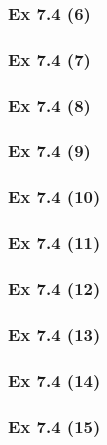 \subsubsection{Ex 7.4 (6)}\label{sec:Ex_7.4.6}

\subsubsection{Ex 7.4 (7)}\label{sec:Ex_7.4.7}

\subsubsection{Ex 7.4 (8)}\label{sec:Ex_7.4.8}

\subsubsection{Ex 7.4 (9)}\label{sec:Ex_7.4.9}

\subsubsection{Ex 7.4 (10)}\label{sec:Ex_7.4.10}

\newpage		%


\subsubsection{Ex 7.4 (11)}\label{sec:Ex_7.4.11}

\subsubsection{Ex 7.4 (12)}\label{sec:Ex_7.4.12}

\subsubsection{Ex 7.4 (13)}\label{sec:Ex_7.4.13}

\subsubsection{Ex 7.4 (14)}\label{sec:Ex_7.4.14}

\subsubsection{Ex 7.4 (15)}\label{sec:Ex_7.4.15}

